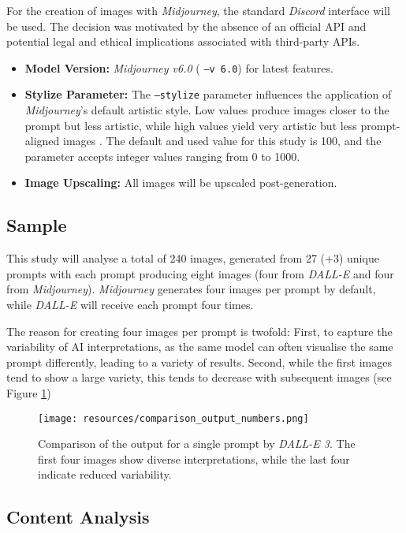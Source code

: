 For the creation of images with \textit{Midjourney}, the standard \textit{Discord} interface will be used. The decision was motivated by the absence of an official API and potential legal and ethical implications associated with third-party APIs.

\begin{itemize}
\item \textbf{Model Version:} \textit{Midjourney v6.0} ( \texttt{--v 6.0}) for latest features.
\item \textbf{Stylize Parameter:}  The \texttt{--stylize} parameter influences the application of \textit{Midjourney}'s default artistic style. Low values produce images closer to the prompt but less artistic, while high values yield very artistic but less prompt-aligned images \parencite{Midjourney}. The default and used value for this study is 100, and the parameter accepts integer values ranging from 0 to 1000.
\item \textbf{Image Upscaling:} All images will be upscaled post-generation.
\end{itemize}

\subsection{Sample}

This study will analyse a total of 240 images, generated from 27 (+3) unique prompts with each prompt producing eight images (four from \textit{DALL-E} and four from \textit{Midjourney}). \textit{Midjourney} generates four images per prompt by default, while \textit{DALL-E} will receive each prompt four times.

The reason for creating four images per prompt is twofold: First, to capture the variability of AI interpretations, as the same model can often visualise the same prompt differently, leading to a variety of results. Second, while the first images tend to show a large variety, this tends to decrease with subsequent images (see Figure \ref{fig:ai_outputs})

\begin{figure}[h]
\centering
\texttt{[image: resources/comparison\_output\_numbers.png]}
\caption[AI Model Image Variability]{Comparison of the output for a single prompt by \textit{DALL-E 3}. The first four images show diverse interpretations, while the last four indicate reduced variability.}
\label{fig:ai_outputs}
\end{figure}

\subsection{Content Analysis}
\label{subsec:manual-content-analysis}

